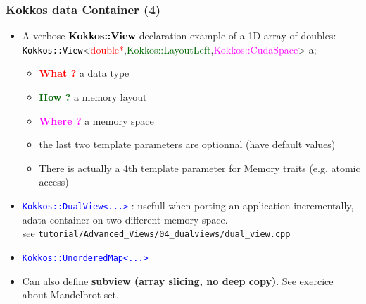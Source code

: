 \begin{frame}[fragile=singleslide]
  \frametitle{Kokkos data Container (4)}

  \begin{itemize}
  \item A verbose \textcolor{black}{\textbf{Kokkos::View}} declaration example of a 1D array of doubles:\\
    \textcolor{black}{\texttt{Kokkos::View}}<\textcolor{red}{double*},\textcolor{darkgreen}{Kokkos::LayoutLeft},\textcolor{magenta}{Kokkos::CudaSpace}> a;
    \begin{itemize}
    \item \textcolor{red}{\textbf{What ?}} a data type
    \item \textcolor{darkgreen}{\textbf{How ?}} a memory layout
    \item \textcolor{magenta}{\textbf{Where ?}} a memory space
    \item the last two template parameters are optionnal (have default values)
    \item There is actually a 4th template parameter for Memory traits (e.g. atomic access)
    \end{itemize}
  \item \textcolor{blue}{\texttt{Kokkos::DualView<...>}} : usefull when porting an application incrementally, adata container on two different memory space.\\
    see \texttt{tutorial/Advanced\_Views/04\_dualviews/dual\_view.cpp}
  \item \textcolor{blue}{\texttt{Kokkos::UnorderedMap<...>}}
  \item Can also define \textbf{subview (array slicing, no deep copy)}. See exercice about Mandelbrot set.
  \end{itemize}
  
\end{frame}

